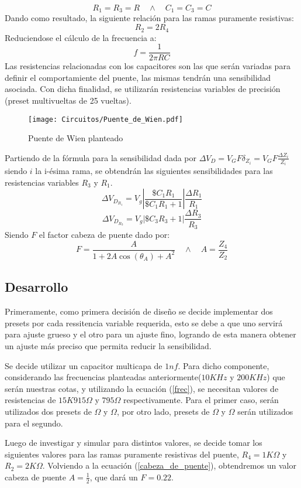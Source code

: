 \begin{equation}
R_1=R_3=R \quad	\wedge \quad C_1=C_3=C
\end{equation}
Dando como resultado, la siguiente relación para las ramas puramente resistivas:
\begin{equation}
R_2=2R_4
\end{equation}
Reduciendose el cálculo de la frecuencia a:
\begin{equation}
f=\frac{1}{2\pi RC}
\label{frec}
\end{equation}
Las resistencias relacionadas con los capacitores son las que serán variadas para definir el comportamiente del puente, las mismas tendrán una sensibilidad asociada. Con dicha finalidad, se utilizarán resistencias variables de precisión (preset multivueltas de 25 vueltas).

\begin{figure}[H]
\centering
\texttt{[image: Circuitos/Puente\_de\_Wien.pdf]}
\caption{Puente de Wien planteado}
\label{fig:Puente_de_wien}
\end{figure}
Partiendo de la fórmula para la sensibilidad dada por $\Delta V_D=V_GF\delta_{Z_i}=V_GF\frac{\Delta Z_i}{Z_i}$ siendo $i$ la i-ésima rama, se obtendrán las siguientes sensibilidades para las resistencias variables $R_3$ y $R_1$.
\begin{equation}
\Delta V_{D_{R_1}}=V_g\left|\frac{\$C_1R_1}{\$C_1R_1+1}\right|\frac{\Delta R_1}{R_1}
\end{equation}
\begin{equation}
\Delta V_{D_{R_3}}=V_g\left|\$C_3R_3+1\right|\frac{\Delta R_3}{R_3}
\end{equation}
Siendo $F$ el factor cabeza de puente dado por:
\begin{equation}
F=\frac{A}{1+2A\cos(\theta_A)+A^2} \quad \wedge \quad A=\frac{Z_4}{Z_2}
\label{cabeza_de_puente}
\end{equation} 
\subsection{Desarrollo}
Primeramente, como primera decisión de diseño se decide implementar dos presets por cada ressitencia variable requerida, esto se debe a que uno servirá para ajuste grueso y el otro para un ajuste fino, logrando de esta manera obtener un ajuste más preciso que permita reducir la sensibilidad. \par
Se decide utilizar un capacitor multicapa de $1nf$. Para dicho componente, considerando las frecuencias planteadas anteriormente($10KHz$ y $200KHz$) que serán nuestras cotas, y utilizando la ecuación (\ref{frec}), se necesitan valores de resistencias de $15K915 \Omega$ y $795 \Omega$ respectivamente. 
Para el primer caso, serán utilizados dos presets de $\Omega$ y $\Omega$, por otro lado, presets de $\Omega$ y $\Omega$ serán utilizados para el segundo. \par
Luego de investigar y simular para distintos valores, se decide tomar los siguientes valores para las ramas puramente resistivas del puente, $R_4=1K\Omega$ y $R_2=2K\Omega$. Volviendo a la ecuación (\ref{cabeza_de_puente}), obtendremos un valor cabeza de puente $A=\frac{1}{2}$, que dará un $F=0.22$.

